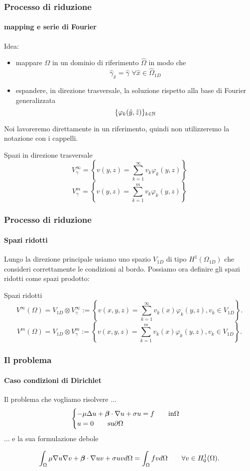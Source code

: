  \begin{frame}
 \frametitle{Processo di riduzione}
 \framesubtitle{mapping e serie di Fourier}
 Idea: 
 \begin{itemize}
  \item mappare $\Omega$ in un dominio di riferimento $\widehat \Omega$ in modo che $$\hat \gamma_{\hat x}=\hat \gamma\,\,\forall \hat x\in\widehat\Omega_{1D}$$
  \item espandere, in direzione trasversale, la soluzione rispetto alla base di Fourier generalizzata $$\{\varphi_k(\hat y,\hat z)\}_{k\in\mathbb{N}}$$
 \end{itemize}
 Noi lavoreremo direttamente in un riferimento, quindi non utilizzeremo la notazione con i cappelli.
 \begin{block}{Spazi in direzione trasversale}
 \footnotesize
  $$V^\infty_\gamma=\left\{v(y,z)=\sum_{k=1}^\infty v_k\varphi_k(y,z)\right\}$$
  $$V^m_\gamma=\left\{v(y,z)=\sum_{k=1}^m v_k\varphi_k(y,z)\right\}$$
 \end{block}
 \end{frame}
\begin{frame}
 \frametitle{Processo di riduzione}
 \framesubtitle{Spazi ridotti}
 Lungo la direzione principale usiamo uno spazio $V_{1D}$ di tipo $H^1(\Omega_{1D})$ che consideri correttamente le condizioni al bordo.
 Possiamo ora definire gli spazi ridotti come spazi prodotto:
 \begin{block}{Spazi ridotti}
  $$V^\infty(\Omega)=V_{1D}\otimes V^\infty_\gamma:=\left\{v(x,y,z)=\sum_{k=1}^\infty v_k(x)\varphi_k(y,z), v_k\in V_{1D}\right\}.$$
  $$V^m(\Omega)=V_{1D}\otimes V^m_\gamma:=\left\{v(x,y,z)=\sum_{k=1}^m v_k(x)\varphi_k(y,z), v_k\in V_{1D}\right\}.$$
  \end{block}
\end{frame}

\begin{frame}
 \frametitle{Il problema}
 \framesubtitle{Caso condizioni di Dirichlet}
 Il problema che vogliamo risolvere ...
 \begin{equation}
  \begin{cases}
   -\mu\Delta u + \boldsymbol{\beta}\cdot \nabla u +\sigma u = f\qquad\text{in}\Omega\\
   u=0\qquad\text{su}\partial{\Omega}
  \end{cases}
 \end{equation}
 ... e la sua formulazione debole
 
 \begin{equation}
  \int_{\Omega} \mu\nabla u \nabla v +\boldsymbol{\beta}\cdot \nabla uv + \sigma uv d\Omega=\int_{\Omega}fv d\Omega\qquad\forall v \in H^1_0(\Omega).
 \end{equation}


\end{frame}

